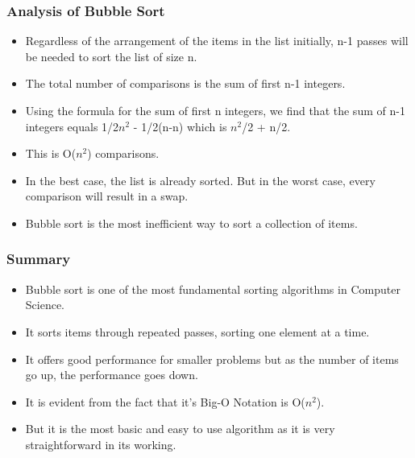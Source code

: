 \documentclass{beamer}
\begin{document}
\begin{frame}
\frametitle{Analysis of Bubble Sort}
\begin{itemize}
\item Regardless of the arrangement of the items  in the list initially, n-1 passes will be needed to sort the list of size n.
\item The total number of comparisons is the sum of first n-1 integers. 
\item Using the formula for the sum of first n integers, we find that the sum of n-1 integers equals 1/2$n^2$ - 1/2(n-n) which is $n^2$/2 + n/2. 
\item This is O($n^2$) comparisons.
\item In the best case, the list is already sorted. But in the worst case, every comparison will result in a swap. 
\item Bubble sort is the most inefficient way to sort a collection of items.
\end{itemize}
\end{frame}

\begin{frame}
\frametitle{Summary}
\begin{itemize}
\item Bubble sort is one of the most fundamental sorting algorithms in Computer Science.
\item It sorts items through repeated passes, sorting one element at a time.
\item It offers good performance for smaller problems but as the number of items  go up, the performance goes down.
\item It is evident from the fact that it's Big-O Notation is O($n^2$).
\item But it is the most basic and easy to use algorithm as it is very straightforward in its working.
\end{itemize}
\end{frame}
\end{document}
